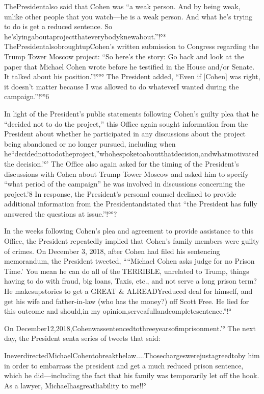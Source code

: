 ThePresidentalso said that Cohen was “a weak person. And by being weak, unlike other people that you watch—he is a weak person. And what he's trying to do is get a reduced sentence. So he'slyingaboutaprojectthateverybodyknewabout.”!°* ThePresidentalsobroughtupCohen's written submission to Congress regarding the Trump Tower Moscow project: “So here's the story: Go back and look at the paper that Michael Cohen wrote before he testified in the House and/or Senate. It talked about his position.”!°°° The President added, “Even if [Cohen] was right, it doesn't matter because I was allowed to do whateverI wanted during the campaign.”!°°6

In light of the President's public statements following Cohen's guilty plea that he “decided not to do the project,” this Office again sought information from the President about whether he participated in any discussions about the project being abandoned or no longer pursued, including when he“decidednottodotheproject,”whohespoketoaboutthatdecision,andwhatmotivated
the decision.'°' The Office also again asked for the timing of the President's discussions with Cohen about Trump Tower Moscow and asked him to specify “what period of the campaign” he was involved in discussions concerning the project.'8 In response, the President's personal counsel declined to provide additional information from the Presidentandstated that “the President has fully answered the questions at issue.”!°°?

In the weeks following Cohen's plea and agreement to provide assistance to this Office, the President repeatedly implied that Cohen's family members were guilty of crimes. On December 3, 2018, after Cohen had filed his sentencing memorandum, the President tweeted, ““Michael Cohen asks judge for no Prison Time.' You mean he can do all of the TERRIBLE, unrelated to Trump, things having to do with fraud, big loans, Taxis, etc., and not serve a long prison term? He makesupstories to get a GREAT & ALREADYreduced deal for himself, and get his wife and father-in-law (who has the money?) off Scott Free. He lied for this outcome and should,in my opinion,serveafullandcompletesentence.”!° 

On December12,2018,Cohenwassentencedtothreeyearsofimprisonment.'° The next day, the President senta series of tweets that said:

IneverdirectedMichaelCohentobreakthelaw....Thosechargeswerejustagreedtoby him in order to embarrass the president and get a much reduced prison sentence, which he did—including the fact that his family was temporarily let off the hook. As a lawyer, Michaelhasgreatliability to me!!°

